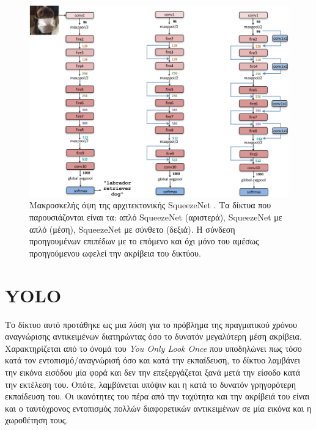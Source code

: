 \begin{figure}[H]
\centering
\includegraphics[width = \textwidth]{figures/SqueezeNetDet/SqueezeNet_macroarchitecture.png}
\caption[Αρχιτεκτονική SqueezeNet]{Μακροσκελής όψη της αρχιτεκτονικής SqueezeNet \cite{2}. Τα δίκτυα που παρουσιάζονται είναι τα: απλό SqueezeNet (αριστερά), SqueezeNet με απλό  (μέση), SqueezeNet με σύνθετο  (δεξιά). Η σύνδεση προηγουμένων επιπέδων με το επόμενο και όχι μόνο του αμέσως προηγούμενου ωφελεί την ακρίβεια του δικτύου.}
\label{fig:SqueezeNet_macroarchitecture}
\end{figure}



\section{YOLO\cite{6}}

Το δίκτυο αυτό προτάθηκε ως μια λύση για το πρόβλημα της πραγματικού χρόνου αναγνώρισης αντικειμένων διατηρώντας όσο το δυνατόν μεγαλύτερη μέση ακρίβεια. Χαρακτηρίζεται από το όνομά του \textit{You Only Look Once} που υποδηλώνει πως τόσο κατά τον εντοπισμό/αναγνώρισή όσο και κατά την εκπαίδευση, το δίκτυο λαμβάνει την εικόνα εισόδου μία φορά και δεν την επεξεργάζεται ξανά μετά την είσοδο κατά την εκτέλεση του. Οπότε, λαμβάνεται υπόψιν και η κατά το δυνατόν γρηγορότερη εκπαίδευση του. Οι ικανότητες του πέρα από την ταχύτητα και την ακρίβειά του είναι και ο ταυτόχρονος εντοπισμός πολλών διαφορετικών αντικειμένων σε μία εικόνα και η χωροθέτηση τους.

